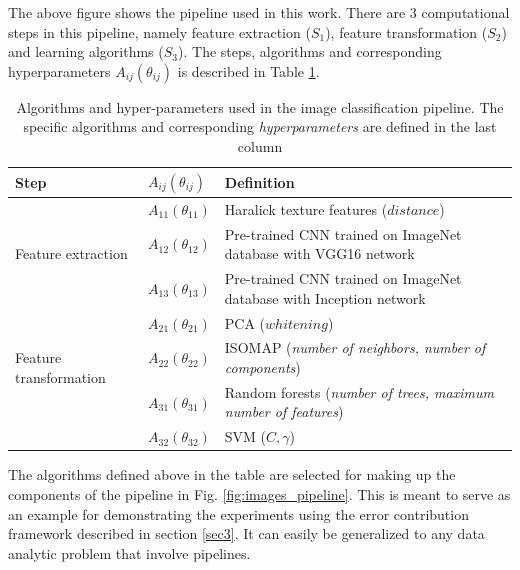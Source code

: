  The above figure shows the pipeline used in this work. There are 3 computational steps in this pipeline, namely feature extraction ($S_1$), feature transformation ($S_2$) and learning algorithms ($S_3$). The steps, algorithms and corresponding hyperparameters $A_{ij}(\theta_{ij})$ is described in Table \ref{table:algorithms_table}.

\begin{table}[H]
\centering
\caption{Algorithms and hyper-parameters used in the image classification pipeline. The specific algorithms and corresponding \textit{hyperparameters} are defined in the last column}
\begin{tabular}{@{} |m{9.7em}|m{1.5cm}|m{8cm}| @{}} 
 \hline
 Step & $A_{ij}(\theta_{ij})$ & Definition \\ 
 \hline
 \multirow{3}{*}{Feature extraction} & $A_{11}(\theta_{11})$ & Haralick texture features ($distance$) \\ 
 & $A_{12}(\theta_{12})$ & Pre-trained CNN trained on ImageNet \cite{deng2009imagenet} database with VGG16 \cite{simonyan2014very} network  \\
  & $A_{13}(\theta_{13})$ & Pre-trained CNN trained on ImageNet \cite{deng2009imagenet} database with Inception \cite{szegedy2016rethinking} network  \\
 \hline
 \multirow{3}{*}{Feature transformation} & $A_{21}(\theta_{21})$ & PCA ($whitening$) \cite{wold1987principal} \\
 & $A_{22}(\theta_{22})$ & ISOMAP (\textit{number of neighbors, number of components}) \cite{tenenbaum2000global} \\
 \hline
 \multirow{3}{*}{Learning algorithms} & $A_{31}(\theta_{31})$ & Random forests (\textit{number of trees, maximum number of features}) \cite{breiman2001random} \\
 & $A_{32}(\theta_{32})$ & SVM ($C, \gamma$) \cite{cortes1995support}\\
 \hline
 \end{tabular}
 \label{table:algorithms_table}
\end{table}
The algorithms defined above in the table are selected for making up the components of the pipeline in Fig. \ref{fig:images_pipeline}. This is meant to serve as an example for demonstrating the experiments using the error contribution framework described in section \ref{sec3}. It can easily be generalized to any data analytic problem that involve pipelines. 

